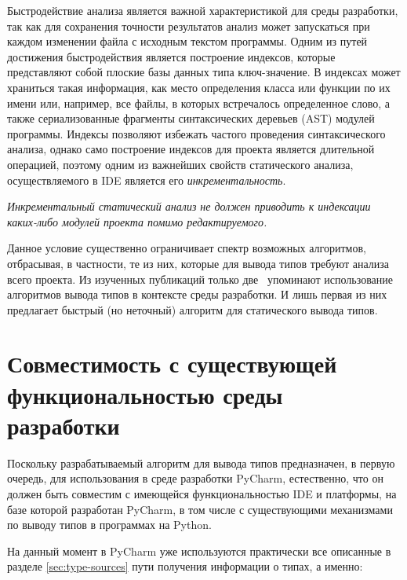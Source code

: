 Быстродействие анализа является важной характеристикой для среды разработки, так
как для сохранения точности результатов анализ может запускаться
при каждом изменении файла с исходным текстом программы. Одним из путей
достижения быстродействия является построение индексов, которые представляют
собой плоские базы данных типа ключ-значение. В индексах может храниться такая
информация, как место определения класса или функции по их имени или,
например, все файлы, в которых встречалось определенное слово, а также
сериализованные фрагменты синтаксических деревьев (AST) модулей программы. Индексы
позволяют избежать частого проведения синтаксического анализа, однако само
построение индексов для проекта является длительной операцией, поэтому одним из
важнейших свойств статического анализа, осуществляемого в IDE является его
\emph{инкрементальность}.


\emph{Инкрементальный статический анализ не должен приводить к индексации 
 каких-либо модулей проекта помимо редактируемого.}

Данное условие существенно ограничивает спектр возможных алгоритмов, отбрасывая,
в частности, те из них, которые для вывода типов требуют анализа всего проекта. Из
 изученных публикаций только две~\cite{Pluquet2009,Haupt2011} упоминают
использование алгоритмов вывода типов в контексте среды разработки. И лишь
первая из них предлагает быстрый (но неточный) алгоритм для статического вывода типов.

\section{Совместимость с существующей функциональностью среды разработки}
\label{sec:compatibility-requirement}

Поскольку разрабатываемый алгоритм для вывода типов предназначен, в первую
очередь, для использования в среде разработки PyCharm, естественно, что он должен
быть совместим с имеющейся функциональностью IDE и платформы, на базе которой
разработан PyCharm, в том числе с существующими механизмами по выводу типов в
программах на Python. 

На данный момент в PyCharm уже используются практически все описанные в разделе
\ref{sec:type-sources} пути получения информации о типах, а именно:

